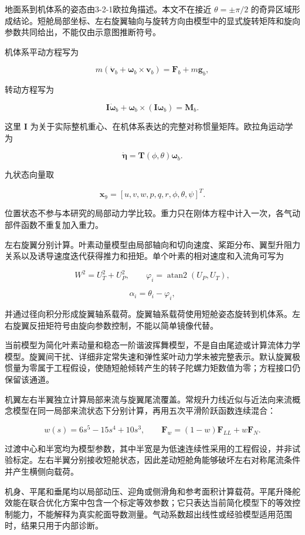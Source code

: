 \documentclass[UTF8,12pt,oneside,openany,fontset=windows]{ctexbook}
\begin{document}
地面系到机体系的姿态由3-2-1欧拉角描述。本文不在接近 $\theta=\pm\pi/2$ 的奇异区域形成结论。短舱局部坐标、左右旋翼轴向与旋转方向由模型中的显式旋转矩阵和旋向参数共同给出，不能仅由示意图推断符号。

机体系平动方程写为

$$m(\dot{\mathbf{v}}_b+\boldsymbol{\omega}_b\times\mathbf{v}_b) =\mathbf{F}_b+m\mathbf{g}_b,$$

转动方程写为

$$\mathbf{I}\dot{\boldsymbol{\omega}}_b +\boldsymbol{\omega}_b\times(\mathbf{I}\boldsymbol{\omega}_b) =\mathbf{M}_b.$$

这里 $\mathbf{I}$ 为关于实际整机重心、在机体系表达的完整对称惯量矩阵。欧拉角运动学为

$$\dot{\boldsymbol{\eta}}=\mathbf{T}(\phi,\theta)\boldsymbol{\omega}_b.$$

九状态向量取

$$\mathbf{x}_9=[u,v,w,p,q,r,\phi,\theta,\psi]^T.$$

位置状态不参与本研究的局部动力学比较。重力只在刚体方程中计入一次，各气动部件函数不重复加入重力。

左右旋翼分别计算。叶素动量模型由局部轴向和切向速度、桨距分布、翼型升阻力关系以及诱导速度迭代获得推力和扭矩。单个叶素的相对速度和入流角可写为

$$W^2=U_T^2+U_P^2,\qquad \varphi_i=\operatorname{atan2}(U_P,U_T),$$

$$\alpha_i=\theta_i-\varphi_i,$$

并通过径向积分形成旋翼轴系载荷。旋翼轴系载荷使用短舱姿态旋转到机体系。左右旋翼反扭矩符号由旋向参数控制，不能以简单镜像代替。

当前模型为简化叶素动量和稳态一阶谐波挥舞模型，不是自由尾迹或计算流体力学模型。旋翼间干扰、详细非定常失速和弹性桨叶动力学未被完整表示。默认旋翼极惯量为零属于工程假设，使随短舱倾转产生的转子陀螺力矩数值为零；方程接口仍保留该通道。

机翼左右半翼独立计算局部来流与旋翼尾流覆盖。常规升力线近似与近法向来流概念模型在同一局部来流状态下分别计算，再用五次平滑阶跃函数连续混合：

$$w(s)=6s^5-15s^4+10s^3,\qquad \mathbf{F}_w=(1-w)\mathbf{F}_{LL}+w\mathbf{F}_{N}.$$

过渡中心和半宽均为模型参数，其中半宽是为低速连续性采用的工程假设，并非试验标定。左右半翼分别接收短舱状态，因此差动短舱角能够破坏左右对称尾流条件并产生横侧向载荷。

机身、平尾和垂尾均以局部动压、迎角或侧滑角和参考面积计算载荷。平尾升降舵效能在联合优化方案中包含一个标定等效参数；它只表达当前简化模型下的等效控制能力，不能解释为真实舵面导数测量。气动系数超出线性或经验模型适用范围时，结果只用于内部诊断。
\end{document}

